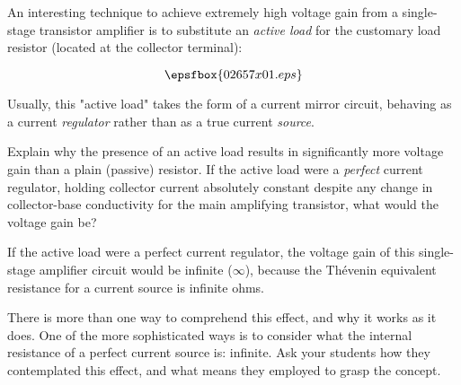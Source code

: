 

An interesting technique to achieve extremely high voltage gain from a single-stage transistor amplifier is to substitute an {\it active load} for the customary load resistor (located at the collector terminal):

$$\epsfbox{02657x01.eps}$$

Usually, this "active load" takes the form of a current mirror circuit, behaving as a current {\it regulator} rather than as a true current {\it source}.

Explain why the presence of an active load results in significantly more voltage gain than a plain (passive) resistor.  If the active load were a {\it perfect} current regulator, holding collector current absolutely constant despite any change in collector-base conductivity for the main amplifying transistor, what would the voltage gain be?







If the active load were a perfect current regulator, the voltage gain of this single-stage amplifier circuit would be infinite ($\infty$), because the Th\'evenin equivalent resistance for a current source is infinite ohms.







There is more than one way to comprehend this effect, and why it works as it does.  One of the more sophisticated ways is to consider what the internal resistance of a perfect current source is: infinite.  Ask your students how they contemplated this effect, and what means they employed to grasp the concept.




